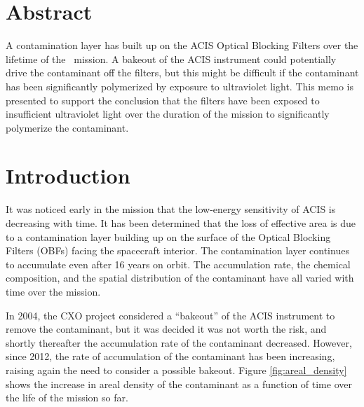 \documentclass[11pt]{article}
\begin{document}


\Date{\today}


\memo{}

\section{Abstract}

A contamination layer has built up on the ACIS Optical Blocking Filters over the
lifetime of the \chandra~mission. A bakeout of the ACIS instrument could potentially
drive the contaminant off the filters, but this might be difficult if the contaminant
has been significantly polymerized by exposure to ultraviolet light. This memo is
presented to support the conclusion that the filters have been exposed to insufficient
ultraviolet light over the duration of the mission to significantly polymerize the contaminant.

\section{Introduction}

It was noticed early in the mission that the low-energy sensitivity of ACIS is
decreasing with time. It has been determined that the loss of effective area is
due to a contamination layer building up on the surface of the Optical Blocking
Filters (OBFs) facing the spacecraft interior. The contamination layer continues
to accumulate even after 16 years on orbit. The accumulation rate, the chemical
composition, and the spatial distribution of the contaminant have all varied with
time over the mission.

In 2004, the CXO project considered a ``bakeout'' of the ACIS instrument to remove
the contaminant, but it was decided it was not worth the risk, and shortly thereafter
the accumulation rate of the contaminant decreased. However, since 2012, the rate of
accumulation of the contaminant has been increasing, raising again the need to consider
a possible bakeout. Figure \ref{fig:areal_density} shows the increase in areal density
of the contaminant as a function of time over the life of the mission so far.
\end{document}
